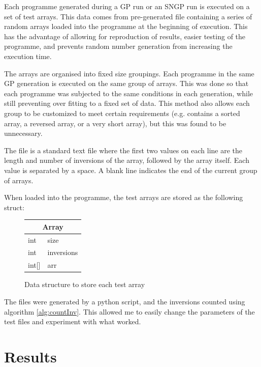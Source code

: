 \documentclass{article}
\begin{document}
        Each programme generated during a GP run or an SNGP run is executed on a set of test arrays. This data comes from pre-generated file containing a series of random arrays loaded into the programme at the beginning of execution. This has the advantage of allowing for reproduction of results, easier testing of the programme, and prevents random number generation from increasing the execution time.
        
        The arrays are organised into fixed size groupings. Each programme in the same GP generation is executed on the same group of arrays. This was done so that each programme was subjected to the same conditions in each generation, while still preventing over fitting to a fixed set of data. This method also allows each group to be customized to meet certain requirements (e.g. contains a sorted array, a reversed array, or a very short array), but this was found to be unnecessary.
        
        The file is a standard text file where the first two values on each line are the length and number of inversions of the array, followed by the array itself. Each value is separated by a space. A blank line indicates the end of the current group of arrays.
        
        When loaded into the programme, the test arrays are stored as the following struct:
        
        \begin{figure}[h]
            \centering
            \begin{tabular}{|l l|}
                \hline
                \multicolumn{2}{|c|}{Array}\\
                \hline
                int & size \\
                int & inversions\\
                int[] & arr\\
                \hline
            \end{tabular}
            \caption{Data structure to store each test array}
            
            \label{struct:array}
        \end{figure}
    
    	The files were generated by a python script, and the inversions counted using algorithm \ref{alg:countInv}. This allowed me to easily change the parameters of the test files and experiment with what worked.

    \section{Results}
\end{document}
